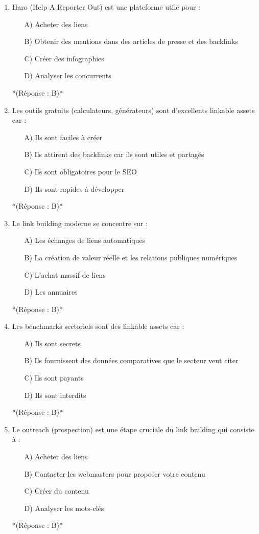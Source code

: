 \documentclass[12pt,a4paper,twoside]{report}
\begin{document}
\begin{enumerate}
\item Haro (Help A Reporter Out) est une plateforme utile pour :
\begin{itemize}
\item[A)] Acheter des liens
\item[B)] Obtenir des mentions dans des articles de presse et des backlinks
\item[C)] Créer des infographies
\item[D)] Analyser les concurrents
\end{itemize}
*(Réponse : B)*

\item Les outils gratuits (calculateurs, générateurs) sont d'excellents linkable assets car :
\begin{itemize}
\item[A)] Ils sont faciles à créer
\item[B)] Ils attirent des backlinks car ils sont utiles et partagés
\item[C)] Ils sont obligatoires pour le SEO
\item[D)] Ils sont rapides à développer
\end{itemize}
*(Réponse : B)*

\item Le link building moderne se concentre sur :
\begin{itemize}
\item[A)] Les échanges de liens automatiques
\item[B)] La création de valeur réelle et les relations publiques numériques
\item[C)] L'achat massif de liens
\item[D)] Les annuaires
\end{itemize}
*(Réponse : B)*

\item Les benchmarks sectoriels sont des linkable assets car :
\begin{itemize}
\item[A)] Ils sont secrets
\item[B)] Ils fournissent des données comparatives que le secteur veut citer
\item[C)] Ils sont payants
\item[D)] Ils sont interdits
\end{itemize}
*(Réponse : B)*

\item Le outreach (prospection) est une étape cruciale du link building qui consiste à :
\begin{itemize}
\item[A)] Acheter des liens
\item[B)] Contacter les webmasters pour proposer votre contenu
\item[C)] Créer du contenu
\item[D)] Analyser les mots-clés
\end{itemize}
*(Réponse : B)*


\end{enumerate}
\end{document}
